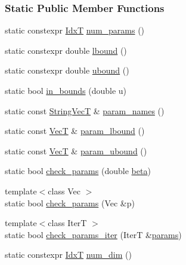 \subsubsection*{Static Public Member Functions}
\begin{DoxyCompactItemize}
\item 
static constexpr \hyperlink{namespaceprior__hessian_aa8d589f74e88bfa3b5750118acd1ab78}{IdxT} \hyperlink{classprior__hessian_1_1SymmetricBetaDist_ae97856abf1dcb2d53ca8fa1dda024143}{num\+\_\+params} ()
\item 
static constexpr double \hyperlink{classprior__hessian_1_1SymmetricBetaDist_a744ee31960d652c397f1b9ac1df4f1e6}{lbound} ()
\item 
static constexpr double \hyperlink{classprior__hessian_1_1SymmetricBetaDist_ad1766580dc336913711d6e1ed94a7f7a}{ubound} ()
\item 
static bool \hyperlink{classprior__hessian_1_1SymmetricBetaDist_adb2019dedddd7dcc5e1dae1207d8684d}{in\+\_\+bounds} (double u)
\item 
static const \hyperlink{namespaceprior__hessian_a61fc0176249462ee94fe3cca92cf3f8c}{String\+VecT} \& \hyperlink{classprior__hessian_1_1SymmetricBetaDist_ace8b0b0489adef1d211be04bff12b7d8}{param\+\_\+names} ()
\item 
static const \hyperlink{namespaceprior__hessian_a0b42fc70dec525d83fb2ac155d9ab974}{VecT} \& \hyperlink{classprior__hessian_1_1SymmetricBetaDist_ae4fc7c25b61f508900a0b65fb78515ec}{param\+\_\+lbound} ()
\item 
static const \hyperlink{namespaceprior__hessian_a0b42fc70dec525d83fb2ac155d9ab974}{VecT} \& \hyperlink{classprior__hessian_1_1SymmetricBetaDist_a59cc29572feb20c003130c417249809d}{param\+\_\+ubound} ()
\item 
static bool \hyperlink{classprior__hessian_1_1SymmetricBetaDist_a9b43cde8d440d3680ef052a38cea9f47}{check\+\_\+params} (double \hyperlink{classprior__hessian_1_1SymmetricBetaDist_a1e726eb12d98240778d7c0bfaafc7edd}{beta})
\item 
{\footnotesize template$<$class Vec $>$ }\\static bool \hyperlink{classprior__hessian_1_1SymmetricBetaDist_a686b74070adcb5df2815741d586b242b}{check\+\_\+params} (Vec \&p)
\item 
{\footnotesize template$<$class IterT $>$ }\\static bool \hyperlink{classprior__hessian_1_1SymmetricBetaDist_ae44cf9a26f2f8649b8f29c7ca8e7ef24}{check\+\_\+params\+\_\+iter} (IterT \&\hyperlink{classprior__hessian_1_1SymmetricBetaDist_a2db7bdb8013ac523f58d2b252ea0dbb4}{params})
\item 
static constexpr \hyperlink{namespaceprior__hessian_aa8d589f74e88bfa3b5750118acd1ab78}{IdxT} \hyperlink{classprior__hessian_1_1UnivariateDist_a688fb42b0a1908ecb758c568c0d8462f}{num\+\_\+dim} ()
\end{DoxyCompactItemize}
